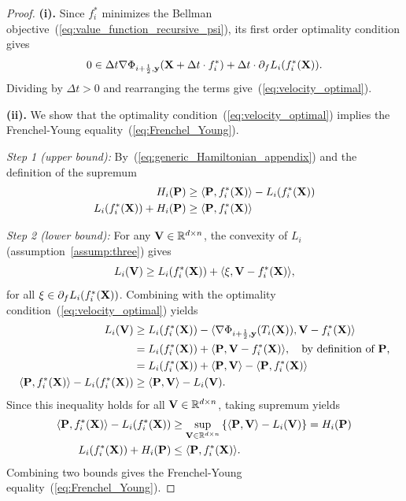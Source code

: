 \documentclass[journal]{IEEEtran}
\def\eqref#1{equation~\ref{#1}}
\newcommand{\bfP}{{\bf P}}
\newcommand{\bfV}{{\bf V}}
\newcommand{\bfX}{{\bf X}}
\newcommand{\bfy}{ {\bf y}}
\renewcommand{\eqref}[1]{(\ref{#1})}
\theoremstyle{plain}
\theoremstyle{definition}
\theoremstyle{remark}
\begin{document}
\begin{proof}
    \textbf{(i).} Since $f_i^*$ minimizes the Bellman objective~\eqref{eq:value_function_recursive_psi}, its first order optimality condition gives
    \begin{equation}
         0 \in \Delta t \nabla  \Phi_{i+\frac{1}{2}, \bfy}(\bfX + \Delta t \cdot f_i^*) + \Delta t \cdot \partial_f L_i(f_i^*(\bfX)).
    \end{equation}
    Dividing by $\Delta t>0$ and rearranging the terms give~\eqref{eq:velocity_optimal}.

    \textbf{(ii).} We show that the optimality condition~\eqref{eq:velocity_optimal} implies the Frenchel-Young equality~\eqref{eq:Frenchel_Young}.

    \textit{Step 1 (upper bound):} By~\eqref{eq:generic_Hamiltonian_appendix} and the definition of the supremum
    \begin{align*}
        H_i(\bfP) &\geq \langle \bfP, f_i^*(\bfX) \rangle - L_i(f_i^*(\bfX))\\
        L_i(f_i^*(\bfX)) + H_i(\bfP) &\geq \langle \bfP, f_i^*(\bfX) \rangle
    \end{align*}

    \textit{Step 2 (lower bound):} For any $\bfV \in \mathbb{R}^{d \times n}$, the convexity of $L_i$ (assumption~\ref{assump:three}) gives 
    \[
    L_i(\bfV) \geq L_i(f_i^*(\bfX)) + \langle \xi, \bfV - f_i^*(\bfX) \rangle,
    \]
    for all $\xi \in \partial_f L_i(f^*_i(\bfX))$. 
    Combining with the optimality condition~\eqref{eq:velocity_optimal} yields
    \begin{align*}
    L_i(\bfV) &\geq L_i(f_i^*(\bfX)) - \langle \nabla \Phi_{{i+\frac{1}{2}, \bfy}}(T_i(\bfX)), \bfV - f_i^*(\bfX) \rangle \\
    &= L_i(f_i^*(\bfX)) + \langle \bfP, \bfV - f_i^*(\bfX) \rangle, \quad \text{by definition of $\bfP$,} \\
    &= L_i(f_i^*(\bfX)) + \langle \bfP, \bfV \rangle - \langle \bfP, f_i^*(\bfX) \rangle \\
    \langle \bfP, f_i^*(\bfX) \rangle - L_i(f_i^*(\bfX)) &\geq \langle \bfP, \bfV \rangle - L_i(\bfV).
    \end{align*}
    Since this inequality holds for all $\bfV \in \mathbb{R}^{d \times n}$, taking supremum yields
    \begin{align*}
        \langle \bfP, f_i^*(\bfX) \rangle - L_i(f_i^*(\bfX)) &\geq \sup_{\bfV \in \mathbb{R}^{d \times n}} \left\{ \langle \bfP, \bfV \rangle - L_i(\bfV) \right\} = H_i(\bfP) \\
        L_i(f_i^*(\bfX)) + H_i(\bfP) &\leq \langle \bfP, f_i^*(\bfX) \rangle.
    \end{align*}
    Combining two bounds gives the Frenchel-Young equality~\eqref{eq:Frenchel_Young}.


\end{proof}
\end{document}
